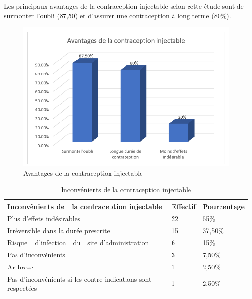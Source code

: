 \noindent Les principaux avantages de la contraception injectable selon cette étude sont de surmonter l’oubli (87,50) et d’assurer une contraception à long terme (80\%). 


\begin{figure}[H]
  \centering
  \includegraphics[scale=1.23]{Images/fig_50.png}
  \caption{Avantages de la contraception injectable}
\end{figure}

\begin{table}[H]
  \centering
  \renewcommand{\arraystretch}{1.5}
  \caption{Inconvénients de la contraception injectable}
  \begin{spacing}{1.5} %
  \begin{tabularx}{\textwidth}{|p{8cm}|X|X|}
      \hline
      \rowcolor{customcolor}
      \textbf{\color{white}Inconvénients \hspace{1cm} de \,\, la  \newline contraception injectable} & \textbf{\color{white}Effectif} & \textbf{\color{white}Pourcentage}  \\
      \hline
      Plus d’effets indésirables & 22 & 55\% \\
      \hline
      Irréversible dans la durée prescrite  & 15 & 37,50\% \\
      \hline
      Risque \,\,\, d’infection \,\, du \,\, site \newline d’administration & 6 & 15\% \\
      \hline
      Pas d’inconvénients & 3 & 7,50\% \\
      \hline
      Arthrose & 1 & 2,50\% \\
      \hline
      Pas d’inconvénients si les contre-indications sont respectées & 1 & 2,50\% \\
      \hline
  \end{tabularx}
\end{spacing}

\end{table}

